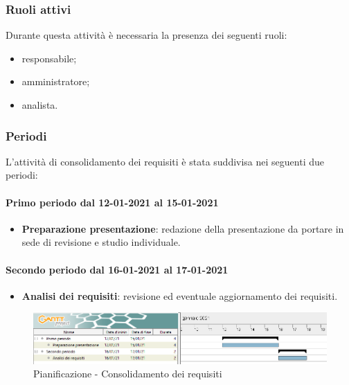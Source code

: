\subsubsection{Ruoli attivi}
Durante questa attività è necessaria la presenza dei seguenti ruoli:
\begin{itemize}
	\item responsabile;
	\item amministratore;
	\item analista.
\end{itemize}

\subsubsection{Periodi}
L'attività di consolidamento dei requisiti è stata suddivisa nei seguenti due periodi:

\paragraph{Primo periodo dal 12-01-2021 al 15-01-2021}
\begin{itemize}

	\item \textbf{Preparazione presentazione}: redazione della presentazione da portare in sede di revisione e studio individuale.

\end{itemize}

\paragraph{Secondo periodo dal 16-01-2021 al 17-01-2021}
\begin{itemize}

	\item \textbf{Analisi dei requisiti}: revisione ed eventuale aggiornamento dei requisiti.

\end{itemize}

\newpage

\begin{landscape}
	\begin{figure}[h!]
		\includegraphics[width=24cm]{images/2_Consolidamento_dei_requisiti.png}
		\caption{Pianificazione - Consolidamento dei requisiti}
	\end{figure}
\end{landscape}

